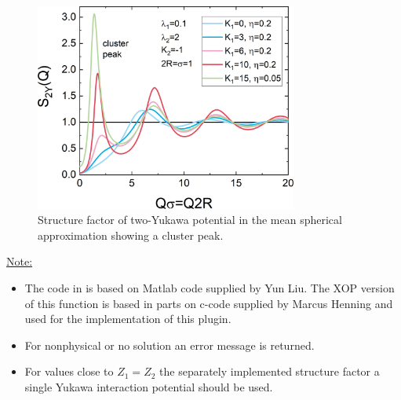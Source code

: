 \begin{figure}[htb]
\begin{center}
\includegraphics[width=0.768\textwidth]{../images/structure_factor/YukawaLike/TwoYukawa.png}
\end{center}
\caption{Structure factor of two-Yukawa potential in the mean spherical approximation showing a cluster peak.} \label{fig:2Yukawa}
\end{figure}

\noindent\underline{Note:}
\begin{itemize}
  \item The code in \SASfit is based on Matlab code supplied by Yun Liu. The XOP version of this function is based in parts on c-code supplied by Marcus Henning and used for the implementation of this plugin.
  \item For nonphysical or no solution an error message is returned.
  \item For values close to $Z_1=Z_2$ the separately implemented structure factor a single Yukawa interaction potential should be used.
\end{itemize} 